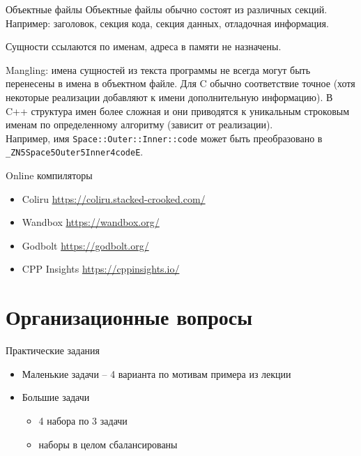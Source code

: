 \documentclass[unknownkeysallowed,xcolor=table]{beamer}
\begin{document}
\begin{frame}{Объектные файлы}
  Объектные файлы обычно состоят из различных секций. Например: заголовок, секция кода, секция данных, отладочная информация.

  Сущности ссылаются по именам, адреса в памяти не назначены.

  Mangling: имена сущностей из текста программы не всегда могут быть перенесены в имена в объектном файле. Для C обычно соответствие точное (хотя некоторые реализации добавляют к имени дополнительную информацию). В C++ структура имен более сложная и они приводятся к уникальным строковым именам по определенному алгоритму (зависит от реализации).\\
  Например, имя \lstinline{Space::Outer::Inner::code} может быть преобразовано в \lstinline{_ZN5Space5Outer5Inner4codeE}.
\end{frame}

\begin{frame}{Online компиляторы}
  \begin{itemize}
    \item Coliru  \href{https://coliru.stacked-crooked.com/}{https://coliru.stacked-crooked.com/} \vspace{3em}
    \item Wandbox  \href{https://wandbox.org/}{https://wandbox.org/} \vspace{3em}
    \item Godbolt  \href{https://godbolt.org/}{https://godbolt.org/} \vspace{3em}
    \item CPP Insights \href{https://cppinsights.io/}{https://cppinsights.io/}
  \end{itemize}
\end{frame}

\section{Организационные вопросы}

\begin{frame}{Практические задания}
  \begin{itemize}
    \item Маленькие задачи -- 4 варианта по мотивам примера из лекции
    \item Большие задачи
      \begin{itemize}
        \item 4 набора по 3 задачи
        \item наборы в целом сбалансированы
      \end{itemize}
  \end{itemize}
\end{frame}
\end{document}
